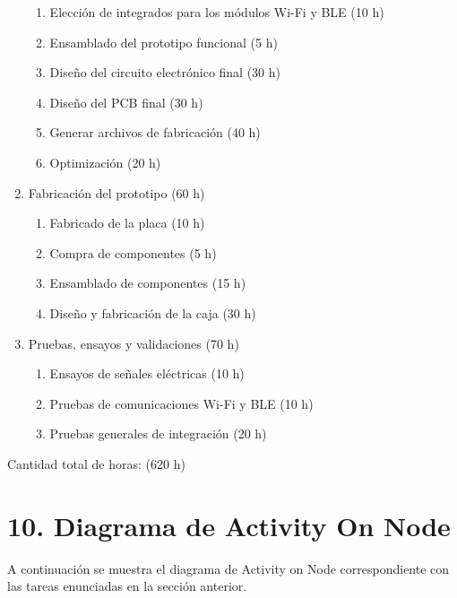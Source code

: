 \documentclass[
11pt, %
codirector, %
]{charter}
\begin{document}
\begin{enumerate}
\begin{enumerate}
    \item Elección de integrados para los módulos Wi-Fi y BLE (10 h)
	\item Ensamblado del prototipo funcional (5 h)
	\item Diseño del circuito electrónico final (30 h)
    \item Diseño del PCB final (30 h)
    \item Generar archivos de fabricación (40 h)
    \item Optimización (20 h)
	\end{enumerate}
 \item Fabricación del prototipo (60 h)
	\begin{enumerate}
	\item Fabricado de la placa (10 h)
	\item Compra de componentes (5 h)
	\item Ensamblado de componentes (15 h)
	\item Diseño y fabricación de la caja (30 h)
	\end{enumerate}
  \item Pruebas, ensayos y validaciones (70 h)
	\begin{enumerate}
	\item Ensayos de señales eléctricas (10 h)
	\item Pruebas de comunicaciones Wi-Fi y BLE (10 h)
	\item Pruebas generales de integración (20 h)
	\end{enumerate}
\end{enumerate}

Cantidad total de horas: (620 h)

\section{10. Diagrama de Activity On Node}
\label{sec:AoN}

A continuación se muestra el diagrama de Activity on Node correspondiente con las tareas enunciadas en la sección anterior.
\end{document}
